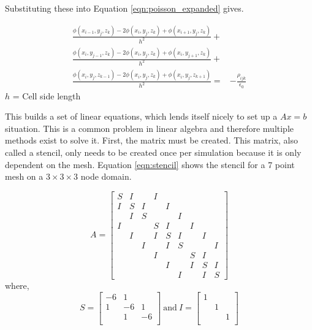 Substituting these into Equation \ref{eqn:poisson_expanded} gives.

\begin{align}\label{eqn:poisson_full}
    \frac{\phi(x_{i-1},y_j,z_k) - 2\phi(x_i,y_j,z_k) + \phi(x_{i+1},y_j,z_k)}{h^2} +& \nonumber \\
    \frac{\phi(x_i,y_{j-1},z_k) - 2\phi(x_i,y_j,z_k) + \phi(x_i,y_{j+1},z_k)}{h^2} +& \nonumber \\
    \frac{\phi(x_i,y_j,z_{k-1}) - 2\phi(x_i,y_j,z_k) + \phi(x_i,y_j,z_{k+1})}{h^2} =& - \frac{\rho_{ijk}}{\epsilon_0}
\end{align}
\(h\) = Cell side length \par

This builds a set of linear equations, which lends itself nicely to set up a \(A x = b\) situation. This is a common problem in linear algebra and therefore multiple methods exist to solve it. First, the matrix must be created. This matrix, also called a stencil, only needs to be created once per simulation because it is only dependent on the mesh. Equation \ref{eqn:stencil} shows the stencil for a 7 point mesh on a \(3\times3\times3\) node domain. \par

\begin{equation}
\label{eqn:stencil}
A = 
\begin{bmatrix}
S & I &  & I &  &  &  &  & \\ 
I & S &I  &  & I &  &  &  & \\ 
 & I & S &  &  &I  &  &  & \\ 
I &  &  & S & I &  &I &  & \\ 
 & I &  & I & S & I &  &I  & \\ 
 &  & I &  & I & S &  &  & I\\ 
 &  &  & I &  &  & S & I & \\ 
 &  &  &  & I &  & I & S & I\\ 
 &  &  &  &  & I &  & I & S
\end{bmatrix}
\end{equation}
where,
\begin{equation} \nonumber
S = 
\begin{bmatrix}
-6 & 1 & \\
1 & -6 & 1\\
 & 1 & -6 \\
\end{bmatrix}
\ \text{and} \ I = 
\begin{bmatrix}
1 &  & \\
 & 1 & \\
 & & 1 \\
\end{bmatrix}
\end{equation}


